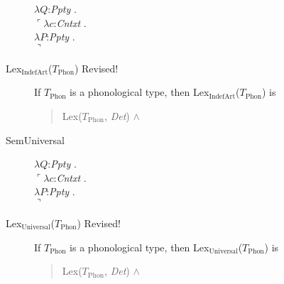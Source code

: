 \begin{description}
$\lambda Q$:\textit{Ppty} . \\
  \hspace*{1em}$\ulcorner\lambda c$:\textit{Cntxt} . \\
  \hspace*{2em}$\lambda P$:\textit{Ppty} . \\
  \hspace*{3em}$\urcorner$



 

        
      \item[\textnormal{Lex$_{\mathrm{IndefArt}}$($T_{\mathrm{Phon}}$)}
        Revised!]
        \mbox{}

        If $T_{\mathrm{Phon}}$ is a phonological type, then
        Lex$_{\mathrm{IndefArt}}$($T_{\mathrm{Phon}}$) is
        \begin{quote}
          Lex($T_{\mathrm{Phon}}$, \textit{Det}) \d{$\wedge$}
        \end{quote}

        
      \item[\textnormal{SemUniversal}] \mbox{}

               $\lambda Q$:\textit{Ppty} . \\
  \hspace*{1em}$\ulcorner\lambda c$:\textit{Cntxt} . \\
  \hspace*{2em}$\lambda P$:\textit{Ppty} . \\
  \hspace*{3em}$\urcorner$

 

  
\item[\textnormal{Lex$_{\mathrm{Universal}}$($T_{\mathrm{Phon}}$)} Revised!]
        \mbox{}

        If $T_{\mathrm{Phon}}$ is a phonological type, then
        Lex$_{\mathrm{Universal}}$($T_{\mathrm{Phon}}$) is
        \begin{quote}
          Lex($T_{\mathrm{Phon}}$, \textit{Det}) \d{$\wedge$}
        \end{quote}


\end{description}
